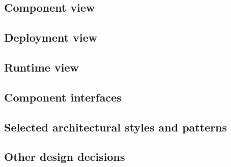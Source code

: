 	\newpage
		\subsection{Component view}
	\newpage	
		\subsection{Deployment view}
	\newpage
		\subsection{Runtime view}
	\newpage
		\subsection{Component interfaces}
	\newpage
		\subsection{Selected architectural styles and patterns}
			
		\subsection{Other design decisions}
%